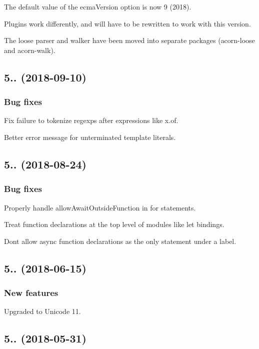 The default value of the {\ttfamily ecma\+Version} option is now 9 (2018).

Plugins work differently, and will have to be rewritten to work with this version.

The loose parser and walker have been moved into separate packages ({\ttfamily acorn-\/loose} and {\ttfamily acorn-\/walk}).

\subsection*{5.. (2018-\/09-\/10)}

\subsubsection*{Bug fixes}

Fix failure to tokenize regexps after expressions like {\ttfamily x.\+of}.

Better error message for unterminated template literals.

\subsection*{5.. (2018-\/08-\/24)}

\subsubsection*{Bug fixes}

Properly handle {\ttfamily allow\+Await\+Outside\+Function} in for statements.

Treat function declarations at the top level of modules like let bindings.

Don\textquotesingle{}t allow async function declarations as the only statement under a label.

\subsection*{5.. (2018-\/06-\/15)}

\subsubsection*{New features}

Upgraded to Unicode 11.

\subsection*{5.. (2018-\/05-\/31)}

